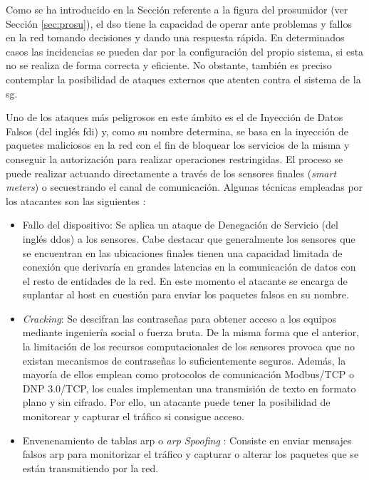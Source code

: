 Como se ha introducido en la Sección referente a la figura del prosumidor (ver Sección \ref{sec:prosu}), el \gls{dso} tiene la capacidad de operar ante problemas y fallos en la red tomando decisiones y dando una respuesta rápida. En determinados casos las incidencias se pueden dar por la configuración del propio sistema, si esta no se realiza de forma correcta y eficiente. No obstante, también es preciso contemplar la posibilidad de ataques externos que atenten contra el sistema de la \gls{sg}.

\vspace{3mm}

Uno de los ataques más peligrosos en este ámbito es el de Inyección de Datos Falsos (del inglés \gls{fdi}) \cite{baddata} y, como su nombre determina, se basa en la inyección de paquetes maliciosos en la red con el fin de bloquear los servicios de la misma y conseguir la autorización para realizar operaciones restringidas. El proceso se puede realizar actuando directamente a través de los sensores finales (\textit{smart meters}) o secuestrando el canal de comunicación. Algunas técnicas empleadas por los atacantes son las siguientes \cite{baddata}:

\begin{itemize}
  \item Fallo del dispositivo: Se aplica un ataque de Denegación de Servicio (del inglés \gls{ddos}) a los sensores. Cabe destacar que generalmente los sensores que se encuentran en las ubicaciones finales tienen una capacidad limitada de conexión que derivaría en grandes latencias en la comunicación de datos con el resto de entidades de la red. En este momento el atacante se encarga de suplantar al host en cuestión para enviar los paquetes falsos en su nombre.
  \item \textit{Cracking}: Se descifran las contraseñas para obtener acceso a los equipos mediante ingeniería social o fuerza bruta. De la misma forma que el anterior, la limitación de los recursos computacionales de los sensores provoca que no existan mecanismos de contraseñas lo suficientemente seguros. Además, la mayoría de ellos emplean como protocolos de comunicación Modbus/TCP o DNP 3.0/TCP, los cuales implementan una transmisión de texto en formato plano y sin cifrado. Por ello, un atacante puede tener la posibilidad de monitorear y capturar el tráfico si consigue acceso.
  \item Envenenamiento de tablas \gls{arp} o \textit{\gls{arp} Spoofing} \cite{arp}: Consiste en enviar mensajes falsos \gls{arp} para monitorizar el tráfico y capturar o alterar los paquetes que se están transmitiendo por la red. 
\end{itemize}


